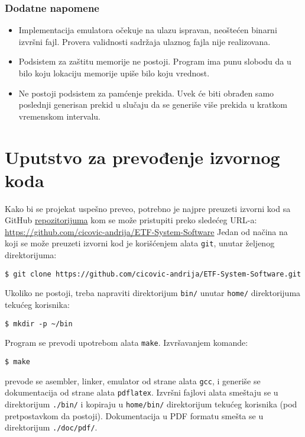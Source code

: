 \subsubsection{Dodatne napomene}
\begin{itemize}
    \item Implementacija emulatora očekuje na ulazu ispravan, neoštećen binarni izvršni
          fajl. Provera validnosti sadržaja ulaznog fajla nije realizovana.
    \item Podsistem za zaštitu memorije ne postoji. Program ima punu slobodu da u bilo
          koju lokaciju memorije upiše bilo koju vrednost.
    \item Ne postoji podsistem za pamćenje prekida. Uvek će biti obrađen samo poslednji
          generisan prekid u slučaju da se generiše više prekida u kra\-tkom vremenskom
          intervalu.
\end{itemize}



\newpage
\section{Uputstvo za prevođenje izvornog koda}
Kako bi se projekat uspešno preveo, potrebno je najpre preuzeti izvorni kod sa GitHub
\href{https://github.com/cicovic-andrija/ETF-System-Software}{repozitorijuma} kom se
može pristupiti preko sledećeg URL-a:\\
\url{https://github.com/cicovic-andrija/ETF-System-Software}
Jedan od načina na koji se može preuzeti izvorni kod je korišćenjem alata \texttt{git},
unutar željenog direktorijuma:
\begin{lstlisting}[frame=noline, backgroundcolor=\color{cyan}]
$ git clone https://github.com/cicovic-andrija/ETF-System-Software.git
\end{lstlisting}
Ukoliko ne postoji, treba napraviti direktorijum \texttt{bin/} unutar
\texttt{home/} direktori\-juma tekućeg korisnika:
\begin{lstlisting}[frame=noline, backgroundcolor=\color{cyan}]
$ mkdir -p ~/bin
\end{lstlisting}
Program se prevodi upotrebom alata \texttt{make}. Izvršavanjem komande:
\begin{lstlisting}[frame=noline, backgroundcolor=\color{cyan}]
$ make
\end{lstlisting}
prevode se asembler, linker, emulator od strane alata \texttt{gcc}, i generiše se
dokumentacija od strane alata \texttt{pdflatex}. Izvršni fajlovi alata smeštaju se
u direktorijum \texttt{./bin/} i kopiraju u \texttt{home/bin/} direktorijum tekućeg korisnika
(pod pretpostavkom da postoji).
Dokumentacija
u PDF formatu smešta se u direktorijum \texttt{./doc/pdf/}.

